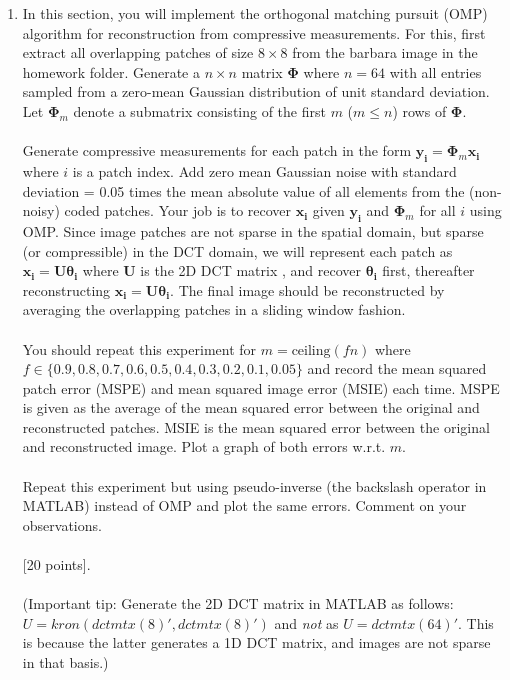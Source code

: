 \documentclass[11pt]{article}
\begin{document}
\begin{enumerate}
\item In this section, you will implement the orthogonal matching pursuit (OMP) algorithm for reconstruction from compressive measurements. For this, first extract all overlapping patches of size $8 \times 8$ from the barbara image in the homework folder. Generate a $n \times n$ matrix $\mathbf{\Phi}$ where $n = 64$ with all entries sampled from a zero-mean Gaussian distribution of unit standard deviation. Let $\mathbf{\Phi}_m$ denote a submatrix consisting of the first $m$ ($m \leq n$) rows of $\mathbf{\Phi}$. 
\\
\\
Generate compressive measurements for each patch in the form $\mathbf{y_i} = \mathbf{\Phi}_m \mathbf{x_i}$ where $i$ is a patch index. Add zero mean Gaussian noise with standard deviation = 0.05 times the mean absolute value of all elements from the (non-noisy) coded patches. Your job is to recover $\mathbf{x_i}$ given $\mathbf{y_i}$ and $\mathbf{\Phi}_m$ for all $i$ using OMP. Since image patches are not sparse in the spatial domain, but sparse (or compressible) in the DCT domain, we will represent each patch as $\mathbf{x_i} = \mathbf{U \theta_i}$ where $\mathbf{U}$ is the 2D DCT matrix , and recover $\mathbf{\theta_i}$ first, thereafter reconstructing $\mathbf{x_i} = \mathbf{U} \mathbf{\theta_i}$. The final image should be reconstructed by averaging the overlapping patches in a sliding window fashion. 
\\
\\
You should repeat this experiment for $m = \textrm{ceiling}(fn)$ where $f \in \{0.9,0.8,0.7,0.6,0.5,0.4,0.3,0.2,0.1,0.05\}$ and record the mean squared patch error (MSPE) and mean squared image error (MSIE) each time. MSPE is given as the average of the mean squared error between the original and reconstructed patches. MSIE is the mean squared error between the original and reconstructed image. Plot a graph of both errors w.r.t. $m$. 
\\
\\
Repeat this experiment but using pseudo-inverse (the backslash operator in MATLAB) instead of OMP and plot the same errors. Comment on your observations.
\\
\\
\textsf{[20 points]}.
\\
\\
(Important tip: Generate the 2D DCT matrix in MATLAB as follows: $U = kron(dctmtx(8)',dctmtx(8)')$ and \emph{not} as $U = dctmtx(64)'$. This is because the latter generates a 1D DCT matrix, and images are not sparse in that basis.)


\end{enumerate}
\end{document}
